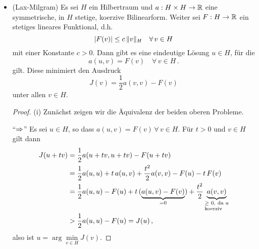 \begin{itemize}
\begin{proof}
Wir rechnen einfach nach, dass der Grenzwert des Differenzenquotienten existiert und verwenden dabei die Bilinearität von $a$ und Linearität von $F$. Seien $u,v \in H$, dann gilt
\begin{align*}
	\mscr D_v J(u) & = \lim_{t\ra 0} \frac{J(u+tv)-J(u)}t \\ 
	&= \lim_{t\ra 0} \frac{J(u) + t \, (a(u,v)-F(v)) + \frac {t^2}2 a(v,v)-J(u)}t \\
	& =  \lim_{t\ra 0}  (a(u,v)-F(v)) + \frac {t}2 a(v,v) \\
	& = a(u,v)-F(v) < \infty\, ,
\end{align*}
da $a$ und $F$ jeweils stetig sind und daher durch $\norm u_H,\norm v_H$ beschränkt sind. Damit folgt die Behauptung.
\end{proof}
\item 
\begin{theorem}\label{theorem:Lax-Milgram}\textnormal{(Lax-Milgram)}
Es sei $H$ ein Hilbertraum und  $a : H \times H \rightarrow \mathbb{R}$ eine symmetrische, in $H$ stetige, koerzive Bilinearform. Weiter sei $F:H\rightarrow \mathbb{R}$ ein stetiges lineares Funktional, d.h.
\[
	\lvert F(v)\rvert \le c \, \lVert v\rVert_H \quad \forall \, v \in H
\]
mit einer Konstante $c >0$. Dann gibt es eine eindeutige Lösung $u \in H$, für die
\[
	a(u,v) = F(v) \quad \forall \, v \in H \, .
\]
gilt. Diese minimiert den Ausdruck
\[
	J(v) = \frac 1 2 a(v,v) - F(v)
\]
unter allen $v \in H$.
\end{theorem}

\begin{proof}
(i) Zunächst zeigen wir die Äquivalenz der beiden oberen Probleme.

"`$\Rightarrow$"' Es sei $u\in H$, so dass $a(u,v) = F(v) \, \forall \, v \in H$. Für $t>0$ und $v\in H$ gilt dann
\begin{align*}
	J(u+tv) & = \frac 1 2 a(u+tv,u+tv) -F(u+tv) \\
	& = \frac 1 2 a(u,u) + t \, a(u,v) + \frac {t^2} 2 a(v,v)-F(u)-t \, F(v) \\
	& = \frac 1 2 a(u,u)-F(u) + t\, (\underbrace{a(u,v)-F(v)}_{=0}) + \frac{t^2}2 \underbrace{a(v,v)}_{\parbox{1.2cm}{\scriptsize$\ge 0$, da $a$ koerziv}} \\
	& > \frac 1 2 a(u,u) - F(u) = J(u) \, ,
\end{align*}
also ist $u = \arg\min\limits_{v\in H} J(v)$.


\end{proof}
\end{itemize}
